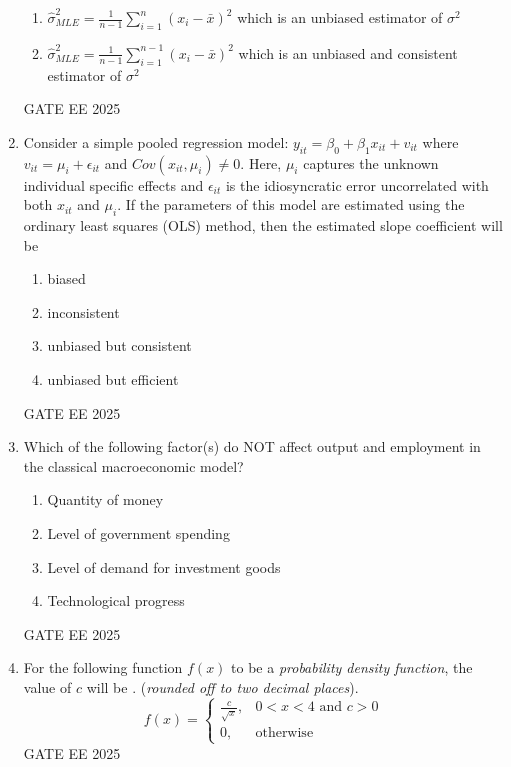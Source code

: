 \documentclass[journal,12pt,onecolumn]{IEEEtran}
\theoremstyle{remark}
\begin{document}
\begin{enumerate}
\begin{enumerate}[label=(\Alph*)]
    \item $\hat{\sigma}_{MLE}^2 = \frac{1}{n-1}\sum_{i=1}^{n}(x_i-\bar{x})^2$ which is an unbiased estimator of $\sigma^2$
    \item $\hat{\sigma}_{MLE}^2 = \frac{1}{n-1}\sum_{i=1}^{n-1}(x_i-\bar{x})^2$ which is an unbiased and consistent estimator of $\sigma^2$
    \end{enumerate}
GATE EE 2025\\
\item Consider a simple pooled regression model: $y_{it} = \beta_0 + \beta_1 x_{it} + v_{it}$ where $v_{it} = \mu_i + \epsilon_{it}$ and $Cov(x_{it},\mu_{i}) \neq 0$. Here, $\mu_{i}$ captures the unknown individual specific effects and $\epsilon_{it}$ is the idiosyncratic error uncorrelated with both $x_{it}$ and $\mu_{i}$. If the parameters of this model are estimated using the ordinary least squares (OLS) method, then the estimated slope coefficient will be
    \begin{enumerate}[label=(\Alph*)]
    \item biased
    \item inconsistent
    \item unbiased but consistent
    \item unbiased but efficient
    \end{enumerate}
GATE EE 2025\\
\item Which of the following factor(s) do NOT affect output and employment in the classical macroeconomic model?
    \begin{enumerate}[label=(\Alph*)]
    \item Quantity of money
    \item Level of government spending
    \item Level of demand for investment goods
    \item Technological progress
    \end{enumerate}
GATE EE 2025\\
\item For the following function $f(x)$ to be a \textit{probability density function}, the value of $c$ will be \underline{\hspace{2cm}}. (\textit{rounded off to two decimal places}).
\[
f(x) =
  \begin{cases}
    \frac{c}{\sqrt{x}}, & 0 < x < 4\text{ and } c > 0 \\
    0, & \text{otherwise}
  \end{cases}
\]
GATE EE 2025\\

\end{enumerate}
\end{document}
